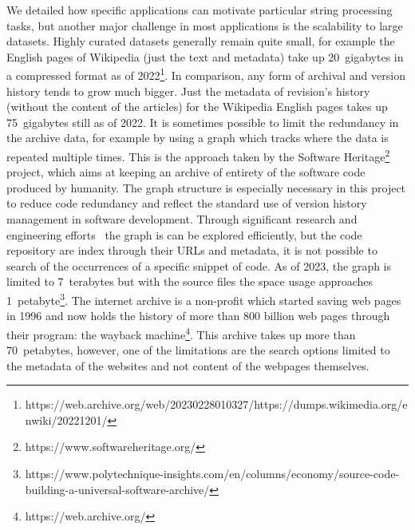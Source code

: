  
We detailed how specific applications can motivate particular string processing tasks, but another major challenge in most applications is the scalability to large datasets.
Highly curated datasets generally remain quite small, for example the English pages of Wikipedia (just the text and metadata) take up 20~gigabytes in a compressed format as of 2022\footnote{https://web.archive.org/web/20230228010327/https://dumps.wikimedia.org/enwiki/20221201/}. In comparison, any form of archival and version history tends to grow much bigger. Just the metadata of revision's history (without the content of the articles) for the Wikipedia English pages takes up 75~gigabytes still as of 2022.
It is sometimes possible to limit the redundancy in the archive data, for example by using a graph which tracks where the data is repeated multiple times. This is the approach taken by the Software Heritage\footnote{https://www.softwareheritage.org/} project, which aims at keeping an archive of entirety of the software code produced by humanity. The graph structure is especially necessary in this project to reduce code redundancy and reflect the standard use of version history management in software development. Through significant research and engineering efforts~\cite{DBLP:phd/hal/Pietri21} the graph is can be explored efficiently, but the code repository are index through their URLs and metadata, it is not possible to search of the occurrences of a specific snippet of code. As of 2023, the graph is limited to 7~terabytes but with the source files the space usage approaches 1~petabyte\footnote{https://www.polytechnique-insights.com/en/columns/economy/source-code-building-a-universal-software-archive/}.
The internet archive is a non-profit which started saving web pages in 1996 and now holds the history of more than 800 billion web pages through their program: the wayback machine\footnote{https://web.archive.org/}. This archive takes up more than 70~petabytes, however, one of the limitations are the search options limited to the metadata of the websites and not content of the webpages themselves.

